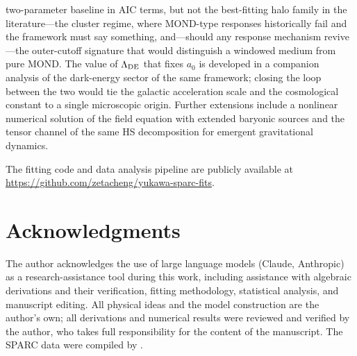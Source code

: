 \documentclass[11pt,a4paper]{article}
\begin{document}
two-parameter baseline in AIC terms, but not the best-fitting halo
family in the literature---the cluster regime, where MOND-type
responses historically fail and the framework must say something,
and---should any response mechanism revive---the outer-cutoff
signature that would distinguish a windowed medium from pure MOND.  The value of $\Lambda_{\rm DE}$ that fixes
$a_0$ is developed in a companion analysis of the dark-energy sector
of the same framework; closing the loop between the two would tie the
galactic acceleration scale and the cosmological constant to a single
microscopic origin.  Further extensions include a nonlinear numerical
solution of the field equation with extended baryonic sources and the
tensor channel of the same HS decomposition for emergent
gravitational dynamics.

The fitting code and data analysis pipeline are publicly available
at \url{https://github.com/zetacheng/yukawa-sparc-fits}.


\section*{Acknowledgments}

The author acknowledges the use of large language models
(Claude, Anthropic) as a research-assistance tool during this
work, including assistance with algebraic derivations and their
verification, fitting methodology, statistical analysis, and
manuscript editing.
All physical ideas and the model construction are the author's
own; all derivations and numerical results were reviewed and
verified by the author, who takes full responsibility for the
content of the manuscript.
The SPARC data were compiled by \cite{Lelli:2016zqa}.


\end{document}
